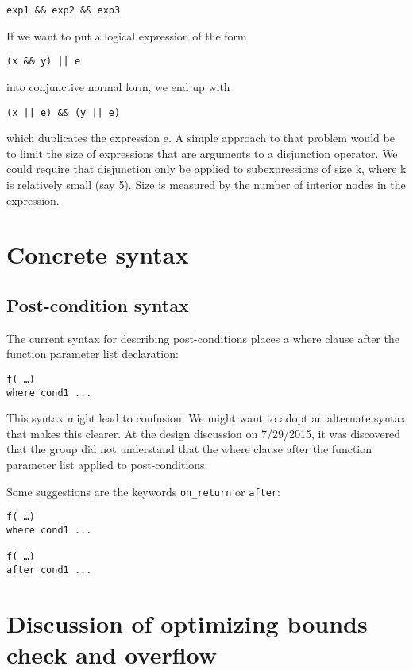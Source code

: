 \begin{verbatim}
exp1 && exp2 && exp3
\end{verbatim}

If we want to put a logical expression of the form
\begin{verbatim}
(x && y) || e
\end{verbatim}

into conjunctive normal form, we end up with

\begin{verbatim}
(x || e) && (y || e)
\end{verbatim}

which duplicates the expression e. A simple approach to that problem
would be to limit the size of expressions that are arguments to a
disjunction operator. We could require that disjunction only be applied
to subexpressions of size k, where k is relatively small (say 5). Size
is measured by the number of interior nodes in the expression.

 \section{Concrete syntax}\label{concrete-syntax}

\subsection{Post-condition syntax}\label{post-condition-syntax}

The current syntax for describing post-conditions places a where clause
after the function parameter list declaration:

\begin{verbatim}
f( …)
where cond1 ...
\end{verbatim}

This syntax might lead to confusion. We might want to adopt an alternate
syntax that makes this clearer. At the design discussion on 7/29/2015,
it was discovered that the group did not understand that the where
clause after the function parameter list applied to post-conditions.

Some suggestions are the keywords \texttt{on\_return} or \texttt{after}:

\begin{verbatim}
f( …)
where cond1 ...

f( …)
after cond1 ...
\end{verbatim}

\section{Discussion of optimizing bounds check and overflow}\label{discussion-of-optimizing-bounds-check-and-overflow}

